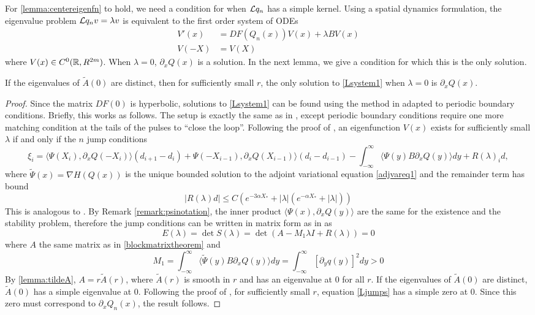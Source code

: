 \documentclass[thesis.tex]{subfiles}
\begin{document}
For \cref{lemma:centereigenfn} to hold, we need a condition for when $\mathcal{L}{q_n}$ has a simple kernel. Using a spatial dynamics formulation, the eigenvalue problem $\mathcal{L}{q_n}v = \lambda v$ is equivalent to the first order system of ODEs 
\begin{equation}\label{Lsystem1}
\begin{aligned}
V'(x) &= DF(Q_n(x))V(x) + \lambda B V(x) \\
V(-X) &= V(X)
\end{aligned}
\end{equation}
where $V(x) \in C^0(\mathbb{R}, R^{2m})$. When $\lambda = 0$, $\partial_x Q(x)$ is a solution. In the next lemma, we give a condition for which this is the only solution.

\begin{lemma}\label{Lsystemeigs}
If the eigenvalues of $\tilde{A}(0)$ are distinct, then for sufficiently small $r$, the only solution to \cref{Lsystem1} when $\lambda = 0$ is $\partial_x Q(x)$.
\begin{proof}
Since the matrix $DF(0)$ is hyperbolic, solutions to \cref{Lsystem1} can be found using the method in \cite{Sandstede1998} adapted to periodic boundary conditions. Briefly, this works as follows. The setup is exactly the same as in \cite{Sandstede1998}, except periodic boundary conditions require one more matching condition at the tails of the pulses to ``close the loop''. Following the proof of \cite[Theorem 2]{Sandstede1998}, an eigenfunction $V(x)$ exists for sufficiently small $\lambda$ if and only if the $n$ jump conditions
\[
\xi_i = \langle \Psi(X_i), \partial_x Q(-X_i) \rangle (d_{i+1} - d_i) + \Psi(-X_{i-1}), \partial_x Q(X_{i-1}) \rangle (d_i - d_{i-1}) - \int_{-\infty}^\infty \langle \Psi(y) B \partial_x Q(y) \rangle dy + R(\lambda)_i d,
\]
where $\tilde{\Psi}(x) = \nabla H(Q(x))$ is the unique bounded solution to the adjoint variational equation \cref{adjvareq1} and the remainder term has bound
\[
|R(\lambda)d| \leq C \left( e^{-3 \alpha X_*} + |\lambda|(e^{-\alpha X_*} + |\lambda| ) \right)
\]
This is analogous to \cite[(3.56)]{Sandstede1998}. By Remark \ref{remark:psinotation}, the inner product $\langle \Psi(x), \partial_x Q(y) \rangle$ are the same for the existence and the stability problem, therefore the jump conditions can be written in matrix form as in \cite[Theorem 2]{Sandstede1998} as
\begin{equation}\label{Ljumps}
E(\lambda) = \det S(\lambda) = \det( A - M_1 \lambda I + R(\lambda)) = 0
\end{equation}
where $A$ the same matrix as in \cref{blockmatrixtheorem} and
\[
M_1 = 
\int_{-\infty}^\infty \langle \tilde{\Psi}(y) B \partial_x Q(y) \rangle dy =  
\int_{-\infty}^\infty [\partial_y q(y)]^2 dy > 0
\]
By \cref{lemma:tildeA}, $A = r \tilde{A}(r)$, where $\tilde{A}(r)$ is smooth in $r$ and has an eigenvalue at 0 for all $r$. If the eigenvalues of $\tilde{A}(0)$ are distinct, $\tilde{A}(0)$ has a simple eigenvalue at 0. Following the proof of \cite[Theorem 3]{Sandstede1998}, for sufficiently small $r$, equation \cref{Ljumps} has a simple zero at 0. Since this zero must correspond to $\partial_x Q_n(x)$, the result follows.
\end{proof}
\end{lemma}
\end{document}
